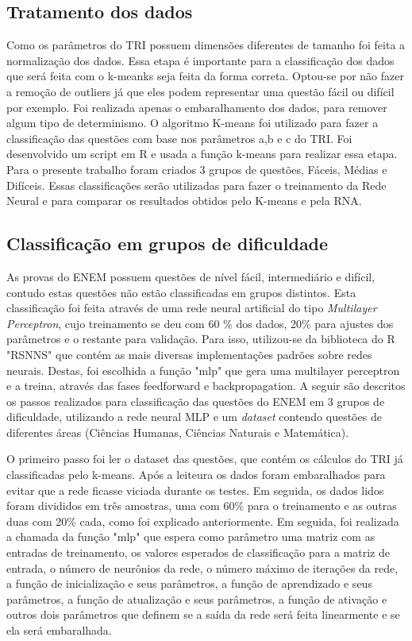 \documentclass[article,	12pt,	oneside, a4paper,	english, brazil, sumario=tradicional, section=TITLE]{abntex2}
\begin{document}
  \subsection{Tratamento dos dados}
  Como os parâmetros do TRI possuem dimensões diferentes de tamanho foi feita a normalização dos dados. Essa etapa é importante para a classificação dos dados que será feita com o k-meanks seja feita da forma correta.
    Optou-se por não fazer a remoção de outliers já que eles podem representar uma questão fácil ou difícil por exemplo. Foi realizada apenas o embaralhamento dos dados, para remover algum tipo de determinismo.
	O algoritmo K-means foi utilizado para fazer a classificação das questões com base nos parâmetros a,b e c do TRI. Foi desenvolvido um script em R e usada a função k-means para realizar essa etapa. Para o presente trabalho foram criados 3 grupos de questões, Fáceis, Médias e Difíceis. Essas classificações serão utilizadas para fazer o treinamento da Rede Neural e para comparar os resultados obtidos pelo K-means e pela RNA.
    
\subsection{Classificação em grupos de dificuldade}
As provas do ENEM possuem questões de nível fácil, intermediário e difícil, contudo estas questões não estão classificadas em grupos distintos. Esta classificação foi feita através de uma rede neural artificial do tipo \textit{Multilayer Perceptron}, cujo treinamento se deu com 60 \% dos dados, 20\% para ajustes dos parâmetros e o restante para validação. Para isso, utilizou-se da biblioteca do R "RSNNS" que contém as mais diversas implementações padrões sobre redes neurais. Destas, foi escolhida a função "mlp" que gera uma multilayer perceptron e a treina, através das fases feedforward e backpropagation. A seguir são descritos os passos realizados para classificação das questões do ENEM em 3 grupos de dificuldade, utilizando a rede neural MLP e um \textit{dataset} contendo questões de diferentes áreas (Ciências Humanas, Ciências Naturais e Matemática).

O primeiro passo foi ler o dataset das questões, que contém os cálculos do TRI já classificadas pelo k-means. Após a leiteura os dados foram embaralhados para evitar que a rede ficasse viciada durante os testes. Em seguida, os dados lidos foram divididos em três amostras, uma com 60\% para o treinamento e as outras duas com 20\% cada, como foi explicado anteriormente. Em seguida, foi realizada a chamada da função 
"mlp" que espera como parâmetro uma matriz com as entradas de treinamento, os valores esperados de classificação para a matriz de entrada, o número de neurônios da rede, o número máximo de iterações da rede, a função de inicialização e seus parâmetros, a função de aprendizado e seus parâmetros, a função de atualização e seus parâmetros, a função de ativação e outros dois parâmetros que definem se a saída da rede será feita linearmente e se ela será embaralhada.
\end{document}
